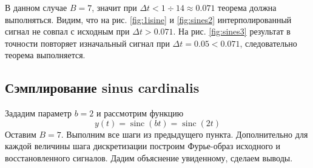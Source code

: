 \documentclass[a4paper, 12pt]{article}
\DeclareMathOperator{\sinc}{sinc}
\begin{document}
    В данном случае $B=7$, значит при $\Delta t < 1\div14\approx 0.071$ теорема должна выполняться. Видим, что на рис. \ref{fig:1isine}
    и \ref{fig:sines2} интерполированный сигнал не совпал с исходным при $\Delta t > 0.071$.
    На рис. \ref{fig:sines3} результат в точности повторяет изначальный сигнал при $\Delta t = 0.05 < 0.071$, следовательно теорема выполняется.


    \subsection{Сэмплирование sinus cardinalis}
    Зададим параметр $b=2$ и рассмотрим функцию $$y(t)=\sinc{(bt)}=\sinc{(2t)}$$
    Оставим $B=7$. Выполним все шаги из предыдущего пункта. Дополнительно для каждой величины
    шага дискретизации построим Фурье-образ исходного и
    восстановленного сигналов. Дадим объяснение увиденному, сделаем выводы.
\end{document}
